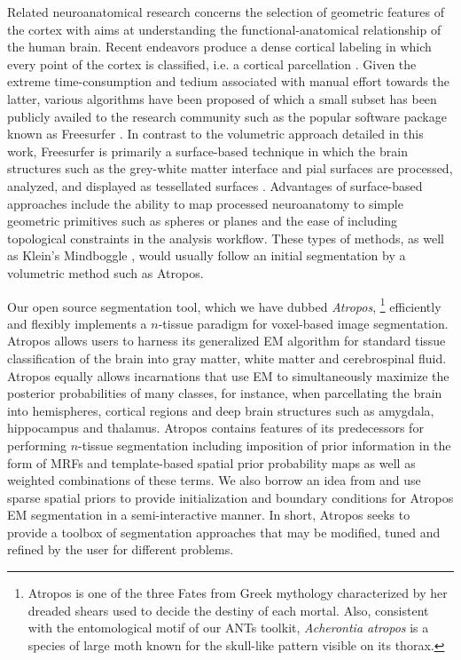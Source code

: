 \documentclass[11pt,english]{article}
\begin{document}
Related neuroanatomical research concerns the selection of geometric
features of the cortex \citep[e.g.][]{Goualher1999} with aims at
understanding the functional-anatomical relationship of the human
brain. Recent endeavors produce a dense cortical labeling in which
every point of the cortex is classified, i.e. a cortical parcellation
\citep{Fischl2004,Heckemann2006,Destrieux2010}.  Given the extreme
time-consumption and tedium associated with manual effort towards the
latter, various algorithms have been proposed of which a small subset
has been publicly availed to the research community such as the
popular software package known as Freesurfer
\citep{Dale1999,Fischl1999,Fischl2004}.  In contrast to the volumetric
approach detailed in this work, Freesurfer is primarily a
surface-based technique in which the brain structures such as the
grey-white matter interface and pial surfaces are processed, analyzed,
and displayed as tessellated surfaces  \cite{Dale1999,Fischl1999}.
Advantages of surface-based approaches include the ability to map
processed neuroanatomy to simple geometric primitives such as spheres
or planes and the ease of including topological constraints in the
analysis workflow.  These types of methods, as well as Klein's
Mindboggle \cite{Klein2005}, would usually follow an initial segmentation by a volumetric method such as Atropos.  



Our open source segmentation tool, which we have dubbed {\em
Atropos}, 
\footnote{ Atropos is one of the three Fates from Greek
mythology characterized by her dreaded shears used to decide the
destiny of each mortal.  Also, consistent with the entomological motif
of our ANTs toolkit, {\it Acherontia atropos} is a species of large
moth known for the skull-like pattern visible on its thorax.  }
efficiently and flexibly implements a $n$-tissue paradigm for
voxel-based image segmentation.  Atropos allows users to harness its
generalized EM algorithm for standard tissue classification of
the brain into gray matter, white matter and cerebrospinal fluid.
Atropos equally allows incarnations that use EM to simultaneously
maximize the posterior probabilities of many classes, for instance,
when parcellating the brain into hemispheres, cortical regions and
deep brain structures such as amygdala, hippocampus and
thalamus.  Atropos contains features of its predecessors for
performing $n$-tissue segmentation including imposition of prior
information in the form of MRFs and template-based spatial prior
probability maps as well as weighted combinations of these terms.  We
also borrow an idea from \cite{Boykov2004} and use sparse spatial
priors to provide initialization and boundary conditions for Atropos
EM segmentation in a semi-interactive manner.  In short, Atropos seeks
to provide a toolbox of segmentation approaches that may be modified,
tuned and refined by the user for different problems.
\end{document}
